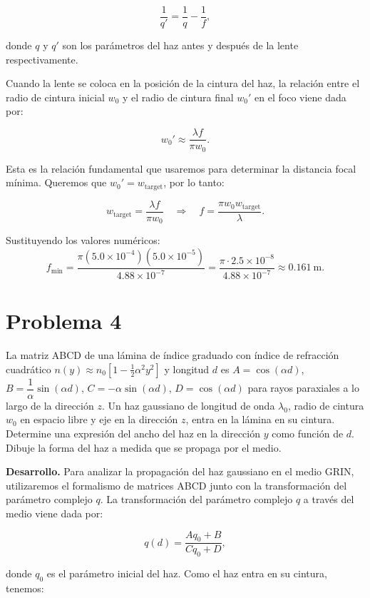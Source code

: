 \documentclass[11pt]{article}
\begin{document}
\[
\frac{1}{q'} = \frac{1}{q} - \frac{1}{f},
\]

donde \(q\) y \(q'\) son los parámetros del haz antes y después de la lente respectivamente.

Cuando la lente se coloca en la posición de la cintura del haz, la relación entre el radio de cintura inicial \(w_0\) y el radio de cintura final \(w_0'\) en el foco viene dada por:

\[
w_0' \approx \frac{\lambda f}{\pi w_0}.
\]

Esta es la relación fundamental que usaremos para determinar la distancia focal mínima. Queremos que \(w_0' = w_{\mathrm{target}}\), por lo tanto:

\[
w_{\mathrm{target}} = \frac{\lambda f}{\pi w_0} \quad\Rightarrow\quad
f = \frac{\pi w_0 w_{\mathrm{target}}}{\lambda}.
\]

Sustituyendo los valores numéricos:
\[
f_{\min} = \frac{\pi (5.0\times 10^{-4})(5.0\times 10^{-5})}{4.88\times 10^{-7}}
= \frac{\pi \cdot 2.5\times 10^{-8}}{4.88\times 10^{-7}}
\approx 0.161\ \mathrm{m}.
\]

\section*{Problema 4}
\noindent La matriz ABCD de una lámina de índice graduado con índice de refracción cuadrático \(n(y)\approx n_0\left[1-\tfrac{1}{2}\alpha^2 y^2\right]\) y longitud \(d\) es \(A=\cos(\alpha d)\), \(B=\dfrac{1}{\alpha}\sin(\alpha d)\), \(C=-\alpha\sin(\alpha d)\), \(D=\cos(\alpha d)\) para rayos paraxiales a lo largo de la dirección \(z\). Un haz gaussiano de longitud de onda \(\lambda_0\), radio de cintura \(w_0\) en espacio libre y eje en la dirección \(z\), entra en la lámina en su cintura. Determine una expresión del ancho del haz en la dirección \(y\) como función de \(d\). Dibuje la forma del haz a medida que se propaga por el medio.

\vspace{0.5em}
\noindent\textbf{Desarrollo.}
Para analizar la propagación del haz gaussiano en el medio GRIN, utilizaremos el formalismo de matrices ABCD junto con la transformación del parámetro complejo \(q\).
La transformación del parámetro complejo \(q\) a través del medio viene dada por:

\[
q(d) = \frac{A q_0 + B}{C q_0 + D},
\]

donde \(q_0\) es el parámetro inicial del haz. Como el haz entra en su cintura, tenemos:
\end{document}
